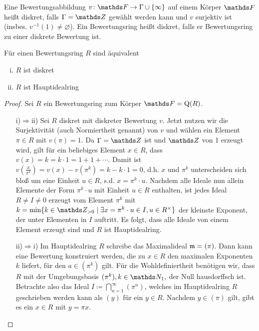 \documentclass[ngerman,fontsize=11pt, paper=a4, parskip=half, titlepage=true, toc=bib]{scrartcl}
\begin{document}
\begin{Def}
  Eine Bewertungsabbildung $v\colon\F\to\Gamma\cup\{\infty\}$
  auf einem Körper $\F$ heißt diskret, falls $\Gamma=\Z$ gewählt
  werden kann und $v$ surjektiv ist (insbes. $v^{-1}(1)\neq \varnothing$).
  Ein Bewertungsring heißt diskret, falls er Bewertungsring zu einer
  diskrete Bewertung ist.
\end{Def}

\begin{Satz}\label{bewertungsringhir}
  Für einen Bewertungsring $R$ sind äquivalent
  \begin{enumerate}[i)]
  \item $R$ ist diskret
  \item $R$ ist Hauptidealring
  \end{enumerate}
  \begin{proof}
    Sei $R$ ein Bewertungsring zum Körper $\F=\Quot(R)$.
    \begin{itemize}
    \item[i)$\Rightarrow$ii)] Sei $R$ diskret mit diskreter Bewertung $v$.
      Jetzt nutzen wir die Surjektivität (auch 
      Normiertheit genannt) von $v$ und wählen ein Element $\pi\in R$
      mit $v(\pi)=1$. Da $\Gamma=\Z$ ist und $\Z$ von 1 erzeugt wird,
      gilt für ein beliebiges Element $x\in R$, dass 
      $v(x)=k=k\cdot 1=1+1+\dotsb$. Damit ist 
      $v(\frac{x}{\pi^k})=v(x)-v(\pi^k)= k-k\cdot 1=0$, d.h. $x$ und 
      $\pi^k$ unterscheiden sich bloß um eine Einheit $u\in R$, s.d.
      $x=\pi^k \cdot u$.
      Nachdem alle Ideale nun allein Elemente der Form $\pi^k\cdot u$
      mit Einheit $u\in R$ enthalten, ist jedes Ideal $R\neq I\neq 0$ 
      erzeugt vom Element $\pi^k$ mit 
      $k=\min\{k\in\Z_{>0}\mid \exists x=\pi^k\cdot u\in I, u\in \Rx\}$
      der kleinste Exponent, der unter Elementen in $I$ auftritt.
      Es folgt, dass alle Ideale von einem Element erzeugt sind und
      $R$ ist Hauptidealring.
    \item[ii)$\Rightarrow$i)] Im Hauptidealring $R$ schreibe das 
      Maximalideal $\mathfrak{m}=(\pi)$. Dann kann eine Bewertung
      konstruiert werden, die zu $x\in R$ den maximalen Exponenten $k$ liefert, 
      für den $a\in (\pi^k)$ gilt.
      Für die Wohldefiniertheit benötigen wir, dass $R$ mit der
      Umgebungsbasis $(\pi^k),k\in\N_1,$ der Null hausdorffsch ist.
      Betrachte also das Ideal
      $I\coloneqq\bigcap_{n=1}^\infty(\pi^n)$,
      welches im Hauptidealring $R$ geschrieben werden kann als $(y)$ für
      ein $y\in R$.
      Nachdem $y\in(\pi)$ gilt, gibt es ein $x\in R$ mit $y=\pi x$.

\end{itemize}
\end{proof}
\end{Satz}
\end{document}
